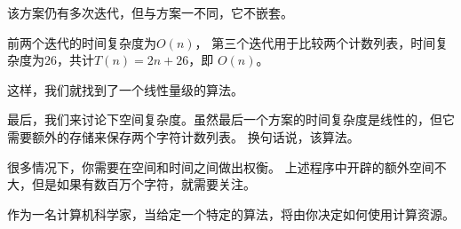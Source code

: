 \begin{frame}\ft{\subsecname}
  
\end{frame}


\begin{frame}\ft{\subsecname}
  该方案仍有多次迭代，但与方案一不同，它不嵌套。

  前两个迭代的时间复杂度为$O(n)$， 第三个迭代用于比较两个计数列表，时间复杂度为$26$，共计$T(n)=2n+26$，即 $O(n)$。


  这样，我们就找到了一个线性量级的算法。

\end{frame}


\begin{frame}\ft{\subsecname}

  最后，我们来讨论下空间复杂度。虽然最后一个方案的时间复杂度是线性的，但它需要额外的存储来保存两个字符计数列表。
  换句话说，该算法。 \pause 


  很多情况下，你需要在空间和时间之间做出权衡。
  上述程序中开辟的额外空间不大，但是如果有数百万个字符，就需要关注。\pause 

  作为一名计算机科学家，当给定一个特定的算法，将由你决定如何使用计算资源。
\end{frame}